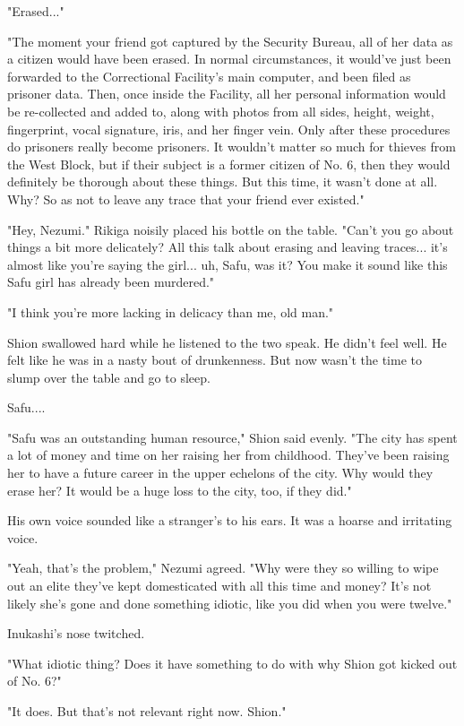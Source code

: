 "Erased..."

"The moment your friend got captured by the Security Bureau, all of her
data as a citizen would have been erased. In normal circumstances, it
would've just been forwarded to the Correctional Facility's main
computer, and been filed as prisoner data. Then, once inside the
Facility, all her personal information would be re-collected and added
to, along with photos from all sides, height, weight, fingerprint, vocal
signature, iris, and her finger vein. Only after these procedures do
prisoners really become prisoners. It wouldn't matter so much for
thieves from the West Block, but if their subject is a former citizen of
No. 6, then they would definitely be thorough about these things. But
this time, it wasn't done at all. Why? So as not to leave any trace that
your friend ever existed."

"Hey, Nezumi." Rikiga noisily placed his bottle on the table. "Can't you
go about things a bit more delicately? All this talk about erasing and
leaving traces... it's almost like you're saying the girl... uh, Safu,
was it? You make it sound like this Safu girl has already been
murdered."

"I think you're more lacking in delicacy than me, old man."

Shion swallowed hard while he listened to the two speak. He didn't feel
well. He felt like he was in a nasty bout of drunkenness. But now wasn't
the time to slump over the table and go to sleep.

Safu....

"Safu was an outstanding human resource," Shion said evenly. "The city
has spent a lot of money and time on her raising her from childhood.
They've been raising her to have a future career in the upper echelons
of the city. Why would they erase her? It would be a huge loss to the
city, too, if they did."

His own voice sounded like a stranger's to his ears. It was a hoarse and
irritating voice.

"Yeah, that's the problem," Nezumi agreed. "Why were they so willing to
wipe out an elite they've kept domesticated with all this time and
money? It's not likely she's gone and done something idiotic, like you
did when you were twelve."

Inukashi's nose twitched.

"What idiotic thing? Does it have something to do with why Shion got
kicked out of No. 6?"

"It does. But that's not relevant right now. Shion."

